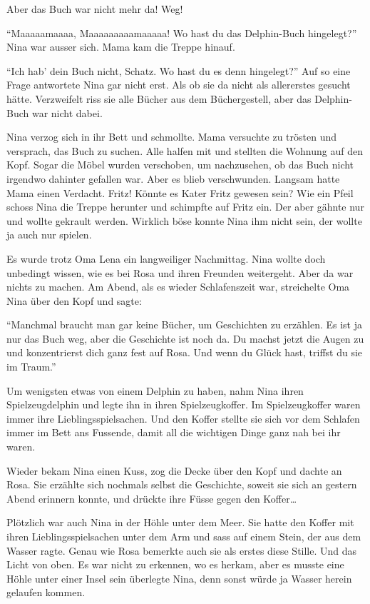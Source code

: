 Aber das Buch war nicht mehr da! Weg!

\enquote{Maaaaamaaaa, Maaaaaaaaamaaaaa! Wo hast du das Delphin-Buch hingelegt?} Nina war ausser sich. Mama kam die Treppe hinauf.

\enquote{Ich hab' dein Buch nicht, Schatz. Wo hast du es denn hingelegt?} Auf so eine Frage antwortete Nina gar nicht erst. Als ob sie da nicht als allererstes gesucht hätte. Verzweifelt riss sie alle Bücher aus dem Büchergestell, aber das Delphin-Buch war nicht dabei.

Nina verzog sich in ihr Bett und schmollte. Mama versuchte zu trösten und versprach, das Buch zu suchen. Alle halfen mit und stellten die Wohnung auf den Kopf. Sogar die Möbel wurden verschoben, um nachzusehen, ob das Buch nicht irgendwo dahinter gefallen war. Aber es blieb verschwunden.  Langsam hatte Mama einen Verdacht. Fritz! Könnte es Kater Fritz gewesen sein? Wie ein Pfeil schoss Nina die Treppe herunter und schimpfte auf Fritz ein. Der aber gähnte nur und wollte gekrault werden. Wirklich böse konnte Nina ihm nicht sein, der wollte ja auch nur spielen.

Es wurde trotz Oma Lena ein langweiliger Nachmittag. Nina wollte doch unbedingt wissen, wie es bei Rosa und ihren Freunden weitergeht. Aber da war nichts zu machen. Am Abend, als es wieder Schlafenszeit war, streichelte Oma Nina über den Kopf und sagte:

\enquote{Manchmal braucht man gar keine Bücher, um Geschichten zu erzählen. Es ist ja nur das Buch weg, aber die Geschichte ist noch da. Du machst jetzt die Augen zu und konzentrierst dich ganz fest auf Rosa. Und wenn du Glück hast, triffst du sie im Traum.}

Um wenigsten etwas von einem Delphin zu haben, nahm Nina ihren Spielzeugdelphin und legte ihn in ihren Spielzeugkoffer. Im Spielzeugkoffer waren immer ihre Lieblingsspielsachen. Und den Koffer stellte sie sich vor dem Schlafen immer im Bett ans Fussende, damit all die wichtigen Dinge ganz nah bei ihr waren.

Wieder bekam Nina einen Kuss, zog die Decke über den Kopf und dachte an Rosa. Sie erzählte sich nochmals selbst die Geschichte, soweit sie sich an gestern Abend erinnern konnte, und drückte ihre Füsse gegen den Koffer\dots

\vspace{10pt}
 \centerline{\Huge \Dolphin[red]}
\vspace{10pt}

Plötzlich war auch Nina in der Höhle unter dem Meer. Sie hatte den Koffer mit ihren Lieblingsspielsachen unter dem Arm und sass auf einem Stein, der aus dem Wasser ragte. Genau wie Rosa bemerkte auch sie als erstes diese Stille. Und das Licht von oben. Es war nicht zu erkennen, wo es herkam, aber es musste eine Höhle unter einer Insel sein überlegte Nina, denn sonst würde ja Wasser herein gelaufen kommen.

